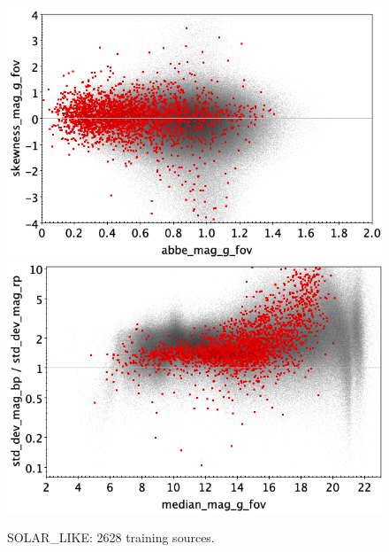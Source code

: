 \documentclass[longauth]{aa}
\begin{document}
\begin{appendix}
\begin{figure}
\vspace{4mm}
 \includegraphics[width=0.45\hsize]{figures/appendix/SOLAR_trn_ask.png}  %
\hspace{2mm}
 \includegraphics[width=0.45\hsize]{figures/appendix/SOLAR_trn_msdr.png}  \\ %
\vspace{4mm}
 \caption{SOLAR\_LIKE: 2628 training sources.}  
 \label{fig:app:SOLAR_trn}
\end{figure}


\end{appendix}
\end{document}
